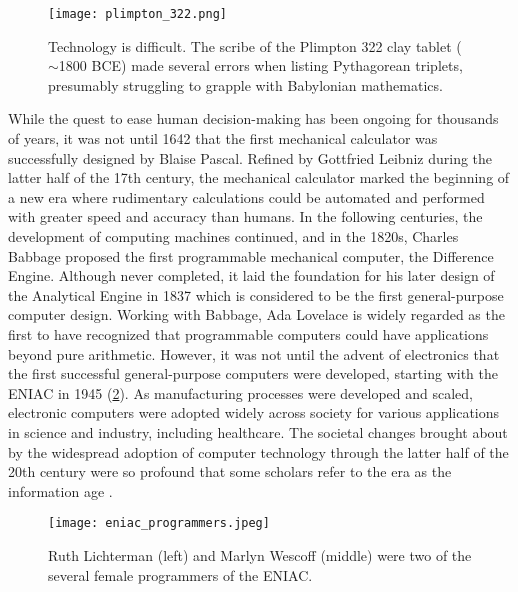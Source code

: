 \begin{figure}[t]
    \centering
    \texttt{[image: plimpton\_322.png]}
    \caption{Technology is difficult. The scribe of the Plimpton 322 clay tablet ($\sim$1800 BCE) made several errors when listing Pythagorean triplets, presumably struggling to grapple with Babylonian mathematics.}
    \label{fig:plimpton_332}
\end{figure}

While the quest to ease human decision-making has been ongoing for thousands of years, it was not until 1642 that the first mechanical calculator was successfully designed by Blaise Pascal. Refined by Gottfried Leibniz during the latter half of the 17th century, the mechanical calculator marked the beginning of a new era where rudimentary calculations could be automated and performed with greater speed and accuracy than humans. 
In the following centuries, the development of computing machines continued, and in the 1820s, Charles Babbage proposed the first programmable mechanical computer, the Difference Engine. Although never completed, it laid the foundation for his later design of the Analytical Engine in 1837 which is considered to be the first general-purpose computer design. 
Working with Babbage, Ada Lovelace is widely regarded as the first to have recognized that programmable computers could have applications beyond pure arithmetic. However, it was not until the advent of electronics that the first successful general-purpose computers were developed, starting with the ENIAC in 1945 (\cref{fig:eniac_programmers}).
As manufacturing processes were developed and scaled, electronic computers were adopted widely across society for various applications in science and industry, including healthcare. 
The societal changes brought about by the widespread adoption of computer technology through the latter half of the 20th century were so profound that some scholars refer to the era as the information age \cite{georges_universal_2001, harari_sapiens_2011}.

\begin{figure}[t]
    \centering
    \texttt{[image: eniac\_programmers.jpeg]}
    \caption{Ruth Lichterman (left) and Marlyn Wescoff (middle) were two of the several female programmers of the ENIAC.} %
    \label{fig:eniac_programmers}
\end{figure}

